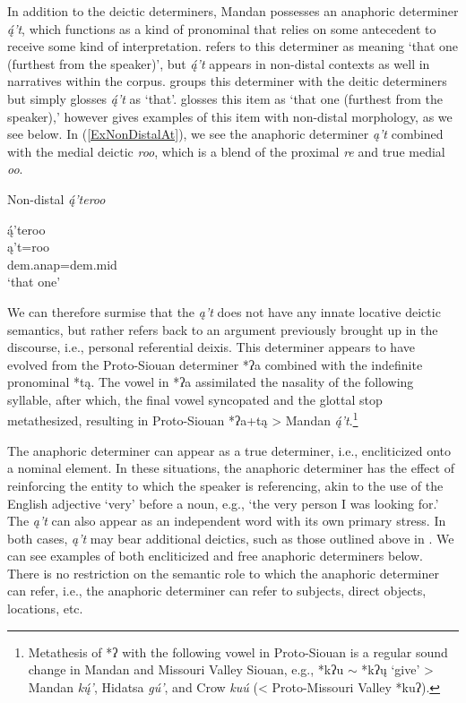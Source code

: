 In addition to the deictic determiners, Mandan possesses an anaphoric determiner \textit{ą́'t}, which functions as a kind of pronominal that relies on some antecedent to receive some kind of interpretation. \citet[61]{hollow1970} refers to this determiner as meaning `that one (furthest from the speaker)', but \textit{ą́'t} appears in non-distal contexts as well in narratives within the corpus. \citet[42]{mixco1997a}
groups this determiner with the deitic determiners but simply glosses \textit{ą́'t} as `that'. \citet[61]{hollow1970} glosses this item as `that one (furthest from the speaker),'
however \citeauthor{hollow1970} gives examples of this item with non-distal morphology, as we see below. In (\ref{ExNonDistalAt}), we see the anaphoric determiner \textit{ą't} combined with the medial deictic \textit{roo}, which is a blend of the proximal \textit{re} and true medial \textit{oo}.


\begin{exe}

\item\label{ExNonDistalAt} Non-distal \textit{ą́'teroo}

\glll ą́'teroo\\
    ą't=roo\\
    dem.anap=dem.mid\\
    \glt `that one' \citep[61]{hollow1970}

\end{exe}

We can therefore surmise that the \textit{ą't} does not have any innate locative deictic semantics, but rather refers back to an argument previously brought up in the discourse, i.e., personal referential deixis. This determiner appears to have evolved from the Proto-Siouan determiner *ʔa combined with the indefinite pronominal *tą. The vowel in *ʔa assimilated the nasality of the following syllable, after which, the final vowel syncopated and the glottal stop metathesized, resulting in Proto-Siouan *ʔa+tą > Mandan \textit{ą́'t}.\footnote{Metathesis of *ʔ with the following vowel in Proto-Siouan is a regular sound change in Mandan and Missouri Valley Siouan, e.g., *kʔu $\sim$ *kʔų `give' > Mandan \textit{kų́'}, Hidatsa \textit{gú'}, and Crow \textit{kuú} (< Proto-Missouri Valley *kuʔ).}

The anaphoric determiner can appear as a true determiner, i.e., encliticized onto a nominal element. In these situations, the anaphoric determiner has the effect of reinforcing the entity to which the speaker is referencing, akin to the use of the English adjective `very' before a noun, e.g., `the very person I was looking for.' The \textit{ą't} can also appear as an independent word with its own primary stress. In both cases, \textit{ą't} may bear additional deictics, such as those outlined above in . We can see examples of both encliticized and free anaphoric determiners below. There is no restriction on the semantic role to which the anaphoric determiner can refer, i.e., the anaphoric determiner can refer to subjects, direct objects, locations, etc.

